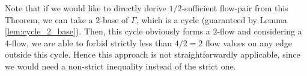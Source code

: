 Note that if we would like to directly derive $1/2$-sufficient flow-pair from this Theorem, we can take a $2$-base of $\Gamma$, which is a cycle (guaranteed by Lemma \ref{lem:cycle_2_base}). Then, this cycle obviously forms a $2$-flow and considering a $4$-flow, we are able to forbid strictly less than $4/2 = 2$ flow values on any edge outside this cycle. Hence this approach is not straightforwardly applicable, since we would need a non-strict inequality instead of the strict one.

